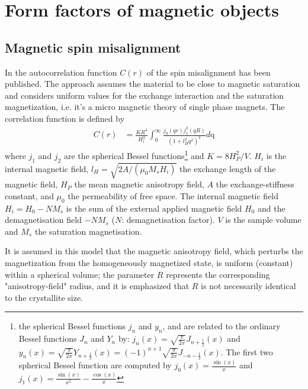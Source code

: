 \clearpage
\section{Form factors of magnetic objects} \hspace{1pt}
\label{sec:magneticstructures}

\subsection{Magnetic spin misalignment} \hspace{1pt}
\label{sec:spinmisalignment}

In \cite{Michels2013} the autocorrelation function $C(r)$ of the
spin misalignment has been published. The approach assumes the
material to be close to magnetic saturation and considers uniform
values for the exchange interaction and the saturation
magnetization, i.e. it's a micro magnetic theory of single phase
magnets. The correlation function is defined by
\begin{align}
C(r) & = \frac{K R^4}{H_i^2} \int_0^\infty
\frac{j_0(qr)j_1^2(qR)}{\left(1+l_H^2q^2\right)^2} d\text{q}
\end{align}
where $j_1$ and $j_2$ are the spherical Bessel
functions\footnote{the spherical Bessel functions $j_n$ and $y_n$,
and are related to the ordinary Bessel functions $J_n$ and $Y_n$ by:
 $j_{n}(x) = \sqrt{\frac{\pi}{2x}} J_{n+\frac{1}{2}}(x)$ and $
 y_{n}(x) = \sqrt{\frac{\pi}{2x}} Y_{n+\frac{1}{2}}(x) = (-1)^{n+1}
 \sqrt{\frac{\pi}{2x}}J_{-n-\frac{1}{2}}(x)$.
 The first two spherical Bessel function are computed by
 $j_0(x)=\frac{\sin(x)} {x}$ and
 $j_1(x)=\frac{\sin(x)} {x^2}- \frac{\cos(x)} {x}$} and $K=8H_P^2/V$.
 $H_i$ is the internal magnetic field, $l_H=\sqrt{2A/(\mu_0 M_s H_i)}$
 the exchange length of the magnetic field, $H_P$ the mean magnetic
 anisotropy field, $A$ the exchange-stiffness constant, and $\mu_0$
 the permeability of free space. The internal magnetic field
 $H_i=H_0-NM_s$ is the sum of the external applied magnetic field
 $H_0$ and the demagnetisation field $-NM_s$ ($N$: demagnetisation
 factor). $V$ is the sample volume and $M_s$ the saturation
 magnetisation.

It is assumed in this model that the magnetic anisotropy field,
which perturbs the magnetization from the homogeneously magnetized
state, is uniform (constant) within a spherical volume; the
parameter $R$ represents the corresponding "anisotropy-field"
radius, and it is emphasized that $R$ is not necessarily identical
to the crystallite size.

